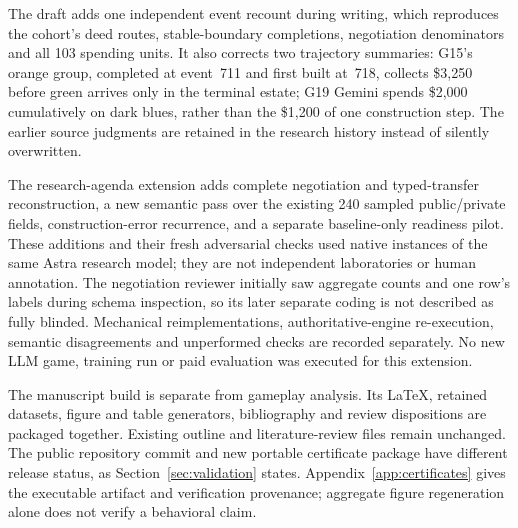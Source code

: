 The draft adds one independent event recount during writing, which reproduces the cohort's deed routes, stable-boundary completions, negotiation denominators and all 103 spending units. It also corrects two trajectory summaries: G15's orange group, completed at event~711 and first built at~718, collects \$3,250 before green arrives only in the terminal estate; G19 Gemini spends \$2,000 cumulatively on dark blues, rather than the \$1,200 of one construction step. The earlier source judgments are retained in the research history instead of silently overwritten.

The research-agenda extension adds complete negotiation and typed-transfer reconstruction, a new semantic pass over the existing 240 sampled public/private fields, construction-error recurrence, and a separate baseline-only readiness pilot. These additions and their fresh adversarial checks used native instances of the same Astra research model; they are not independent laboratories or human annotation. The negotiation reviewer initially saw aggregate counts and one row's labels during schema inspection, so its later separate coding is not described as fully blinded. Mechanical reimplementations, authoritative-engine re-execution, semantic disagreements and unperformed checks are recorded separately. No new LLM game, training run or paid evaluation was executed for this extension.

The manuscript build is separate from gameplay analysis. Its LaTeX, retained datasets, figure and table generators, bibliography and review dispositions are packaged together. Existing outline and literature-review files remain unchanged. The public repository commit and new portable certificate package have different release status, as Section~\ref{sec:validation} states. Appendix~\ref{app:certificates} gives the executable artifact and verification provenance; aggregate figure regeneration alone does not verify a behavioral claim.

